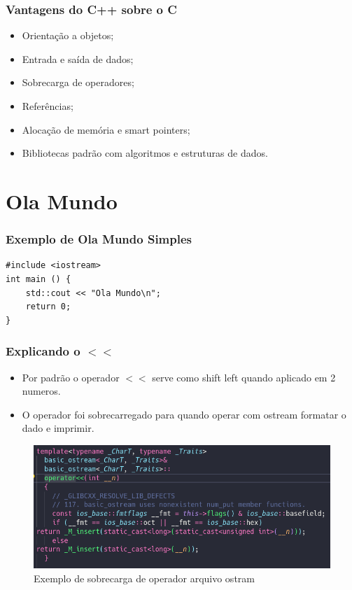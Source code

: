 \documentclass[12pt]{beamer}
\begin{document}
\begin{frame}
    \frametitle{Vantagens do C++ sobre o C}
    \begin{itemize}
        \item Orientação a objetos;
        \item Entrada e saída de dados;
        \item Sobrecarga de operadores;
        \item Referências;
        \item Alocação de memória e smart pointers;
        \item Bibliotecas padrão com algoritmos e estruturas de dados.
    \end{itemize}
\end{frame}

\section{Ola Mundo}\label{Ola Mundo}
\begin{frame}[t,fragile]{\insertsectionhead}
    \frametitle{Exemplo de Ola Mundo Simples}
    \centering
    \begin{lstlisting}
#include <iostream>
int main () {
    std::cout << "Ola Mundo\n";
    return 0;
}
    \end{lstlisting}
\end{frame}

\begin{frame}[allowframebreaks]
    \frametitle{Explicando o $<<$}

    \begin{itemize}
        \item Por padrão o operador $<<$ serve como shift left quando aplicado em 2 numeros.
        \item O operador foi sobrecarregado para quando operar com ostream formatar o dado e imprimir.
    \end{itemize}
    \framebreak
    \begin{figure}
        \centering
        \includegraphics[width=\textwidth]{sobrecarga_std}
        \caption{\label{fig:sobrecarga_std}Exemplo de sobrecarga de operador arquivo ostram}
    \end{figure}
\end{frame}
\end{document}
